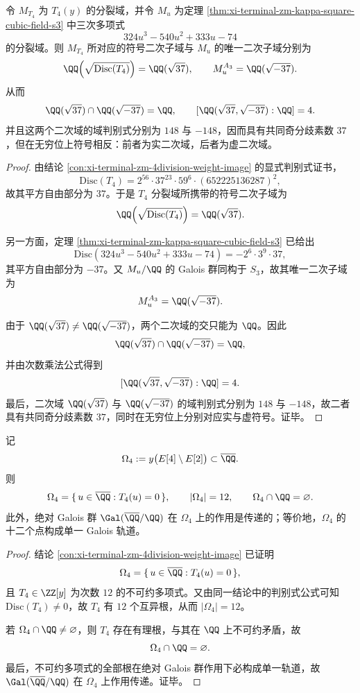 \begin{theorem}\label{thm:xi-terminal-zm-prime37-opposite-sign-quadratic-shadows}
令 \(M_{T_4}\) 为 \(T_4(y)\) 的分裂域，并令 \(M_u\) 为定理 \ref{thm:xi-terminal-zm-kappa-square-cubic-field-s3} 中三次多项式
\[
324u^3-540u^2+333u-74
\]
的分裂域。则 \(M_{T_4}\) 所对应的符号二次子域与 \(M_u\) 的唯一二次子域分别为
\[
\QQ\!\left(\sqrt{\mathrm{Disc}(T_4)}\right)=\QQ(\sqrt{37}),
\qquad
M_u^{A_3}=\QQ(\sqrt{-37}).
\]
从而
\[
\QQ(\sqrt{37})\cap \QQ(\sqrt{-37})=\QQ,
\qquad
[\QQ(\sqrt{37},\sqrt{-37}):\QQ]=4.
\]
并且这两个二次域的域判别式分别为 \(148\) 与 \(-148\)，因而具有共同奇分歧素数 \(37\)，但在无穷位上符号相反：前者为实二次域，后者为虚二次域。
\end{theorem}
\begin{proof}
由结论 \ref{con:xi-terminal-zm-4division-weight-image} 的显式判别式证书，
\[
\mathrm{Disc}(T_4)=2^{56}\cdot 37^{23}\cdot 59^{6}\cdot(652225136287)^2,
\]
故其平方自由部分为 \(37\)。于是 \(T_4\) 分裂域所携带的符号二次子域为
\[
\QQ\!\left(\sqrt{\mathrm{Disc}(T_4)}\right)=\QQ(\sqrt{37}).
\]

另一方面，定理 \ref{thm:xi-terminal-zm-kappa-square-cubic-field-s3} 已给出
\[
\mathrm{Disc}(324u^3-540u^2+333u-74)=-2^{6}\cdot 3^{9}\cdot 37,
\]
其平方自由部分为 \(-37\)。又 \(M_u/\QQ\) 的 Galois 群同构于 \(S_3\)，故其唯一二次子域为
\[
M_u^{A_3}=\QQ(\sqrt{-37}).
\]

由于 \(\QQ(\sqrt{37})\neq \QQ(\sqrt{-37})\)，两个二次域的交只能为 \(\QQ\)。因此
\[
\QQ(\sqrt{37})\cap \QQ(\sqrt{-37})=\QQ,
\]
并由次数乘法公式得到
\[
[\QQ(\sqrt{37},\sqrt{-37}):\QQ]=4.
\]
最后，二次域 \(\QQ(\sqrt{37})\) 与 \(\QQ(\sqrt{-37})\) 的域判别式分别为 \(148\) 与 \(-148\)，故二者具有共同奇分歧素数 \(37\)，同时在无穷位上分别对应实与虚符号。证毕。
\end{proof}

\begin{theorem}\label{thm:xi-terminal-zm-4division-weight-image-single-galois-orbit}
记
\[
\Omega_4:=y\bigl(E[4]\setminus E[2]\bigr)\subset\overline{\QQ}.
\]
则
\[
\Omega_4=\{\,u\in\overline{\QQ}:T_4(u)=0\,\},
\qquad
|\Omega_4|=12,
\qquad
\Omega_4\cap\QQ=\varnothing.
\]
此外，绝对 Galois 群 \(\Gal(\overline{\QQ}/\QQ)\) 在 \(\Omega_4\) 上的作用是传递的；等价地，\(\Omega_4\) 的十二个点构成单一 Galois 轨道。
\end{theorem}
\begin{proof}
结论 \ref{con:xi-terminal-zm-4division-weight-image} 已证明
\[
\Omega_4=\{\,u\in\overline{\QQ}:T_4(u)=0\,\},
\]
且 \(T_4\in\ZZ[y]\) 为次数 \(12\) 的不可约多项式。又由同一结论中的判别式公式可知 \(\mathrm{Disc}(T_4)\neq 0\)，故 \(T_4\) 有 \(12\) 个互异根，从而 \(|\Omega_4|=12\)。

若 \(\Omega_4\cap\QQ\neq\varnothing\)，则 \(T_4\) 存在有理根，与其在 \(\QQ\) 上不可约矛盾，故
\[
\Omega_4\cap\QQ=\varnothing.
\]
最后，不可约多项式的全部根在绝对 Galois 群作用下必构成单一轨道，故 \(\Gal(\overline{\QQ}/\QQ)\) 在 \(\Omega_4\) 上作用传递。证毕。
\end{proof}

